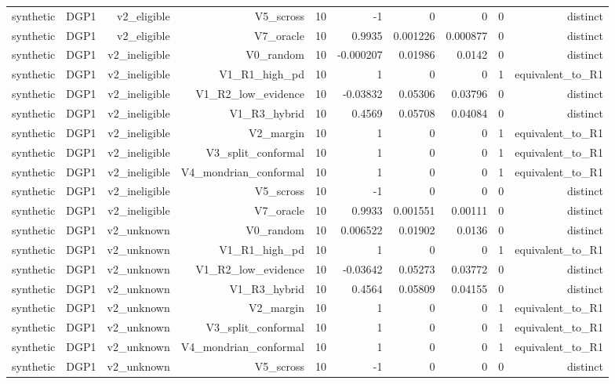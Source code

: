 \begin{table}[htbp]
\begin{tabular}{lrrrrrrrrr}
    synthetic & DGP1 & v2\_eligible & V5\_scross & 10 & -1 & 0 & 0 & 0 & distinct \\
    synthetic & DGP1 & v2\_eligible & V7\_oracle & 10 & 0.9935 & 0.001226 & 0.000877 & 0 & distinct \\
    synthetic & DGP1 & v2\_ineligible & V0\_random & 10 & -0.000207 & 0.01986 & 0.0142 & 0 & distinct \\
    synthetic & DGP1 & v2\_ineligible & V1\_R1\_high\_pd & 10 & 1 & 0 & 0 & 1 & equivalent\_to\_R1 \\
    synthetic & DGP1 & v2\_ineligible & V1\_R2\_low\_evidence & 10 & -0.03832 & 0.05306 & 0.03796 & 0 & distinct \\
    synthetic & DGP1 & v2\_ineligible & V1\_R3\_hybrid & 10 & 0.4569 & 0.05708 & 0.04084 & 0 & distinct \\
    synthetic & DGP1 & v2\_ineligible & V2\_margin & 10 & 1 & 0 & 0 & 1 & equivalent\_to\_R1 \\
    synthetic & DGP1 & v2\_ineligible & V3\_split\_conformal & 10 & 1 & 0 & 0 & 1 & equivalent\_to\_R1 \\
    synthetic & DGP1 & v2\_ineligible & V4\_mondrian\_conformal & 10 & 1 & 0 & 0 & 1 & equivalent\_to\_R1 \\
    synthetic & DGP1 & v2\_ineligible & V5\_scross & 10 & -1 & 0 & 0 & 0 & distinct \\
    synthetic & DGP1 & v2\_ineligible & V7\_oracle & 10 & 0.9933 & 0.001551 & 0.00111 & 0 & distinct \\
    synthetic & DGP1 & v2\_unknown & V0\_random & 10 & 0.006522 & 0.01902 & 0.0136 & 0 & distinct \\
    synthetic & DGP1 & v2\_unknown & V1\_R1\_high\_pd & 10 & 1 & 0 & 0 & 1 & equivalent\_to\_R1 \\
    synthetic & DGP1 & v2\_unknown & V1\_R2\_low\_evidence & 10 & -0.03642 & 0.05273 & 0.03772 & 0 & distinct \\
    synthetic & DGP1 & v2\_unknown & V1\_R3\_hybrid & 10 & 0.4564 & 0.05809 & 0.04155 & 0 & distinct \\
    synthetic & DGP1 & v2\_unknown & V2\_margin & 10 & 1 & 0 & 0 & 1 & equivalent\_to\_R1 \\
    synthetic & DGP1 & v2\_unknown & V3\_split\_conformal & 10 & 1 & 0 & 0 & 1 & equivalent\_to\_R1 \\
    synthetic & DGP1 & v2\_unknown & V4\_mondrian\_conformal & 10 & 1 & 0 & 0 & 1 & equivalent\_to\_R1 \\
    synthetic & DGP1 & v2\_unknown & V5\_scross & 10 & -1 & 0 & 0 & 0 & distinct \\

\end{tabular}
\end{table}
